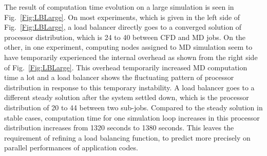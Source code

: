 \documentclass[conference,final]{IEEEtran}
\begin{document}
The result of computation time evolution on a large simulation is seen in Fig.~\ref{Fig:LBLarge}. On most experiments, which is given in the left side of Fig.~\ref{Fig:LBLarge}, a load balancer directly goes to a converged solution of processor distribution, which is 24 to 40 between CFD and MD jobs. On the other, in one experiment, computing nodes assigned to MD simulation seem to have temporarily experienced the internal overhead as shown from the right side of Fig.~\ref{Fig:LBLarge}. This overhead temporarily increased MD computation time a lot and a load balancer shows the fluctuating pattern of processor distribution in response to this temporary instability. A load balancer goes to a different steady solution after the system settled down, which is the processor distribution of 20 to 44 between two sub-jobs. Compared to the steady solution in stable cases, computation time for one simulation loop increases in this processor distribution increases from 1320 seconds to 1380 seconds. This leaves the requirement of refining a load balancing function, to predict more precisely on parallel performances of application codes.
\end{document}

